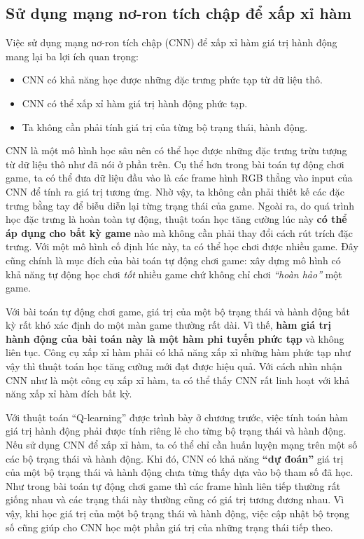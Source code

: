 \subsection{Sử dụng mạng nơ-ron tích chập để xấp xỉ hàm}
	Việc sử dụng mạng nơ-ron tích chập (CNN) để xấp xỉ hàm giá trị hành động mang lại ba lợi ích quan trọng:
	\begin{itemize}
		\item CNN có khả năng học được những đặc trưng phức tạp từ dữ liệu thô.
		\item CNN có thể xấp xỉ hàm giá trị hành động phức tạp.
		\item Ta không cần phải tính giá trị của từng bộ trạng thái, hành động.
	\end{itemize}
	
	CNN là một mô hình học sâu nên có thể học được những đặc trưng trừu tượng từ dữ liệu thô như đã nói ở phần trên.
	Cụ thể hơn trong bài toán tự động chơi game, ta có thể đưa dữ liệu đầu vào là các frame hình RGB thẳng vào input của CNN để tính ra giá trị tương ứng.
	Nhờ vậy, ta không cần phải thiết kế các đặc trưng bằng tay để biễu diễn lại từng trạng thái của game.
	Ngoài ra, do quá trình học đặc trưng là hoàn toàn tự động, thuật toán học tăng cường lúc này \textbf{có thể áp dụng cho bất kỳ game} nào mà không cần phải thay đổi cách rút trích đặc trưng.
	Với một mô hình cố định lúc này, ta có thể học chơi được nhiều game.
	Đây cũng chính là mục đích của bài toán tự động chơi game: xây dựng mô hình có khả năng tự động học chơi \textit{tốt} nhiều game chứ không chỉ chơi \textit{``hoàn hảo''} một game.
	
	Với bài toán tự động chơi game, giá trị của một bộ trạng thái và hành động bất kỳ rất khó xác định do một màn game thường rất dài.
	Vì thế, \textbf{hàm giá trị hành động của bài toán này là một hàm phi tuyến phức tạp} và không liên tục.
	Công cụ xấp xỉ hàm phải có khả năng xấp xỉ những hàm phức tạp như vậy thì thuật toán học tăng cường mới đạt được hiệu quả.
	Với cách nhìn nhận CNN như là một công cụ xấp xỉ hàm, ta có thể thấy CNN rất linh hoạt với khả năng xấp xỉ hàm đích bất kỳ.
	
	Với thuật toán ``Q-learning'' được trình bày ở chương trước, việc tính toán hàm giá trị hành động phải được tính riêng lẻ cho từng bộ trạng thái và hành động. 
	Nếu sử dụng CNN để xấp xỉ hàm, ta có thể chỉ cần huấn luyện mạng trên một số các bộ trạng thái và hành động.
	Khi đó, CNN có khả năng \textbf{``dự đoán''} giá trị của một bộ trạng thái và hành động chưa từng thấy dựa vào bộ tham số đã học.
	Như trong bài toán tự động chơi game thì các frame hình liên tiếp thường rất giống nhau và các trạng thái này thường cũng có giá trị tương đương nhau.
	Vì vậy, khi học giá trị của một bộ trạng thái và hành động, việc cập nhật bộ trọng số cũng giúp cho CNN học một phần giá trị của những trạng thái tiếp theo.
	

